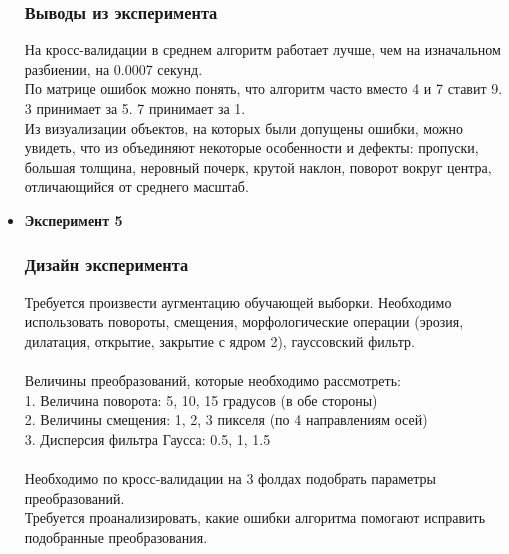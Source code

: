 \documentclass[10pt]{article}
\begin{document}
\begin{itemize}
		    \subsubsection*{Выводы из эксперимента}
		    {
		    	На кросс-валидации в среднем алгоритм работает лучше, чем на изначальном разбиении, на 0.0007 секунд.\\
		    	По матрице ошибок можно понять, что алгоритм часто вместо 4 и 7 ставит 9. 3 принимает за 5. 7 принимает за 1.\\
		    	Из визуализации объектов, на которых были допущены ошибки, можно увидеть, что из объединяют некоторые особенности и дефекты: пропуски, большая толщина, неровный почерк, крутой наклон, поворот вокруг центра, отличающийся от среднего масштаб.
		    }
			
		\item {\bf Эксперимент 5}
		    \subsubsection*{Дизайн эксперимента}
		    {
		    	Требуется произвести аугментацию обучающей выборки. Необходимо использовать повороты, смещения, морфологические операции (эрозия, дилатация, открытие, закрытие с ядром 2), гауссовский фильтр.\\
		    	\\
		    	Величины преобразований, которые необходимо рассмотреть:\\
		    	1. Величина поворота: 5, 10, 15 градусов (в обе стороны)\\
		    	2. Величины смещения: 1, 2, 3 пикселя (по 4 направлениям осей)\\
		    	3. Дисперсия фильтра Гаусса: 0.5, 1, 1.5\\
		    	\\
		    	Необходимо по кросс-валидации на 3 фолдах подобрать параметры преобразований.\\
		    	Требуется проанализировать, какие ошибки алгоритма помогают исправить подобранные преобразования.
		    }
		    

\end{itemize}
\end{document}
